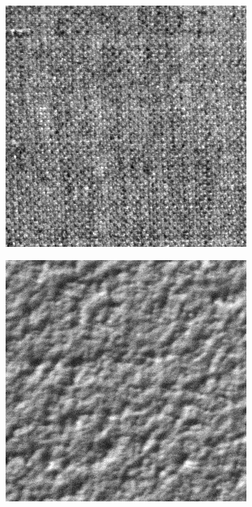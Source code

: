 \begin{figure}[h!]
\begin{subfigure}{.15\textwidth}
  \includegraphics[width=.8\linewidth]{kylberg_examples/canvas1_002.png}
\end{subfigure}
\begin{subfigure}{.15\textwidth}
  \centering
  \includegraphics[width=.8\linewidth]{kylberg_examples/ceiling1_002.png}
\end{subfigure}%
\begin{subfigure}{.15\textwidth}
  \centering

\end{subfigure}
\end{figure}
